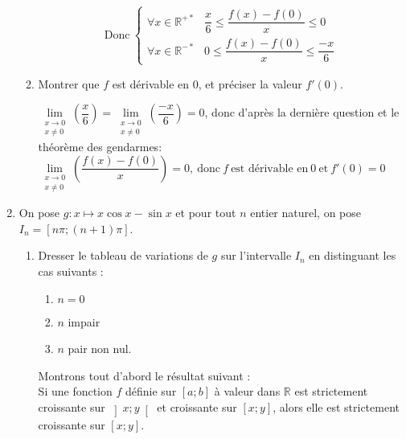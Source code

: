 \documentclass[a4paper,french,bookmarks]{article}
\begin{document}
\begin{enumerate}
\begin{enumerate}
\begin{tcolorbox}[colback=black!3,colframe=black!9,boxrule=.25pt,enhanced,arc is angular,arc=0pt]
    \[\text{Donc} \ \displaystyle \left\lbrace \begin{array}{ll}
        \forall x \in \mathbb{R}^{+*}  & \dfrac{x}{6} \leq \dfrac{f\left(x\right) - f\left(0\right)}{x}\leq 0 \\
        \forall x \in \mathbb{R}^{-*}  & 0 \leq \dfrac{f\left(x\right) - f\left(0\right)}{x}\leq \dfrac{-x}{6} 
    \end{array}\right. \]
    \end{tcolorbox}
    \item Montrer que $f$ est dérivable en $0$, et préciser la valeur $f'(0)$.
    \begin{tcolorbox}[colback=black!3,colframe=black!9,boxrule=.25pt,enhanced,arc is angular,arc=0pt]
    $\lim\limits_{\substack{x \to 0\\x \neq 0}} \left(\dfrac{x}{6}\right) = \lim\limits_{\substack{x \to 0\\x \neq 0}} \left(\dfrac{-x}{6}\right) = 0$, donc d'après la dernière question et le théorème des gendarmes: \(\lim\limits_{\substack{x \to 0\\x \neq 0}} \left(\dfrac{f\left(x\right) - f\left(0\right)}{x}\right) = 0, \ \text{donc} \ f \ \text{est dérivable en} \ 0 \ \text{et} \ f'(0)=0\)
    \end{tcolorbox}
\end{enumerate}
\item On pose $g : x \mapsto x \cos x - \sin x$ et pour tout $n$ entier naturel, on pose $I_n = \left[n\pi; \left(n+1\right)\pi\right]$.
\begin{enumerate}
    \item Dresser le tableau de variations de $g$ sur l'intervalle $I_n$ en distinguant les cas suivants :
    \begin{enumerate}
        \item $n = 0$
        \item $n$ impair
        \item $n$ pair non nul.
    \end{enumerate}
    \begin{tcolorbox}[colback=black!3,colframe=black!9,boxrule=.25pt,enhanced,arc is angular,arc=0pt]
    Montrons tout d'abord le résultat suivant :\\ Si une fonction $f$ définie sur $\left[a;b\right]$ à valeur dans $\mathbb{R}$ est strictement croissante sur $\left]x;y\right[$ et croissante sur $\left[x;y\right]$, alors elle est strictement croissante sur $\left[x;y\right]$.\\
    

\end{tcolorbox}
\end{enumerate}
\end{enumerate}
\end{document}

